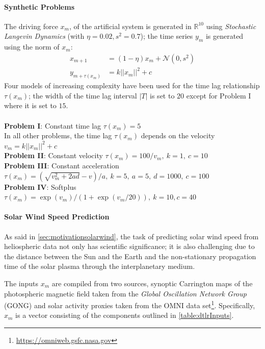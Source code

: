 \paragraph{Synthetic Problems} 
The driving force $x_m$, of the artificial system is generated in $\mathbb{R}^{10}$ using 
\emph{Stochastic Langevin Dynamics} (with $\eta = 0.02, s^2 = 0.7$); the time series $y_m$ is 
generated using the norm of $x_m$:
% 
\begin{align}
 x_{m+1} &= (1 - \eta) x_m + \mathcal{N}(0, s^2) \label{eq:data}\\
 y_{m+\tau(x_m)} &= k ||x_m||^2 + c \label{eq:outputs}
\end{align}
%
Four models of increasing complexity have been used for the time lag relationship $\tau(x_m)$; the 
width of the time lag interval $|T|$ is set to $20$ except for Problem I where it is set to $15$.
\\\\
%
{\bf Problem I}: Constant time lag $\tau(x_m) = 5$\\
%
In all other problems, the time lag $\tau(x_m)$ depends on the velocity $v_m = k ||x_m||^2 + c$\\
%
{\bf Problem II}: Constant velocity $\tau(x_m) = 100/v_m,\ k = 1,\ c = 10$\\
%
{\bf Problem III}: Constant acceleration 
$\tau(x_m) = (\sqrt{v_m^2 + 2ad} - v)/a,\ k = 5,\ a = 5,\ d = 1000, \ c = 100$
\\
%
{\bf Problem IV}: Softplus 
$\tau(x_m) = \exp\left(v_m\right)/\left(1 + \exp(v_m/20)\right), \ k = 10, c = 40$\\

\paragraph{Solar Wind Speed Prediction}\label{sec:solarwind}
As said in \cref{sec:motivationsolarwind}, the task of predicting solar wind speed from 
heliospheric data not only has scientific significance; it is also challenging due to the distance 
between the Sun and the Earth and the non-stationary propagation time of the solar plasma through 
the interplanetary medium. 

The inputs $x_m$ are compiled from two sources, synoptic Carrington maps of the photospheric 
magnetic field taken from the \emph{Global Oscillation Network Group} (GONG) and solar activity 
proxies taken from the OMNI data set\footnote{\url{https://omniweb.gsfc.nasa.gov}}. Specifically, 
$x_m$ is a vector consisting of the components outlined in \cref{table:dtlrInputs}.

